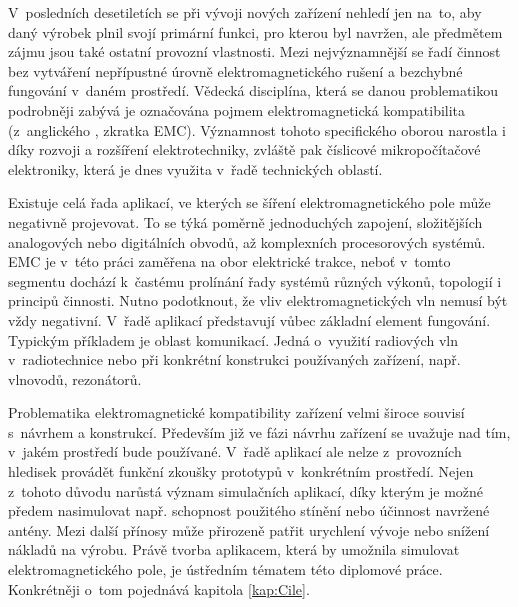 
V~posledních desetiletích se při vývoji nových zařízení nehledí jen na~to, aby daný výrobek plnil svojí primární funkci, pro kterou byl navržen, ale předmětem zájmu jsou také ostatní provozní vlastnosti. Mezi nejvýznamnější se řadí činnost bez vytváření nepřípustné úrovně elektromagnetického rušení a bezchybné fungování v~daném prostředí. Vědecká disciplína, která se danou problematikou podrobněji zabývá je označována pojmem elektromagnetická kompatibilita (z~anglického , zkratka EMC). Významnost tohoto specifického oborou narostla i díky rozvoji a rozšíření elektrotechniky, zvláště pak číslicové mikropočítačové elektroniky, která je dnes využita v~řadě technických oblastí.

Existuje celá řada aplikací, ve kterých se šíření elektromagnetického pole může negativně projevovat. To se týká poměrně jednoduchých zapojení, složitějších analogových nebo digitálních obvodů, až komplexních procesorových systémů. EMC je v~této práci zaměřena na obor elektrické trakce, neboť v~tomto segmentu dochází k~častému prolínání řady systémů různých výkonů, topologií i principů činnosti. Nutno podotknout, že vliv elektromagnetických vln nemusí být vždy negativní. V~řadě aplikací představují vůbec základní element fungování. Typickým příkladem je oblast komunikací. Jedná o~využití radiových vln v~radiotechnice nebo při konkrétní konstrukci používaných zařízení, např. vlnovodů, rezonátorů.

Problematika elektromagnetické kompatibility zařízení velmi široce souvisí s~návrhem a konstrukcí. Především již ve fázi návrhu zařízení se uvažuje nad tím, v~jakém prostředí bude používané. V~řadě aplikací ale nelze z~provozních hledisek provádět funkční zkoušky prototypů v~konkrétním prostředí. Nejen z~tohoto důvodu narůstá význam simulačních aplikací, díky kterým je možné předem nasimulovat např. schopnost použitého stínění nebo účinnost navržené antény. Mezi další přínosy může přirozeně patřit urychlení vývoje nebo snížení nákladů na výrobu. Právě tvorba aplikacem, která by umožnila simulovat elektromagnetického pole, je ústředním tématem této diplomové práce. Konkrétněji o~tom pojednává kapitola \ref{kap:Cile}.

